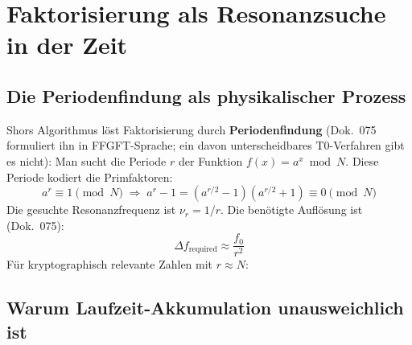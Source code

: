 \section{Faktorisierung als Resonanzsuche in der Zeit}

\subsection{Die Periodenfindung als physikalischer Prozess}

Shors Algorithmus löst Faktorisierung durch \textbf{Periodenfindung}
(Dok.~075 formuliert ihn in FFGFT-Sprache; ein davon unterscheidbares
T0-Verfahren gibt es nicht): Man sucht die Periode $r$ der Funktion
$f(x) = a^x \bmod N$. Diese Periode kodiert die Primfaktoren:
\begin{equation}
    a^r \equiv 1 \pmod{N}
    \;\Rightarrow\;
    a^r - 1 = (a^{r/2} - 1)(a^{r/2} + 1) \equiv 0 \pmod{N}
\end{equation}
Die gesuchte Resonanzfrequenz ist $\nu_r = 1/r$. Die benötigte Auflösung ist
(Dok.~075):
\begin{equation}
    \Delta f_\text{required} \approx \frac{f_0}{r^2}
\end{equation}
Für kryptographisch relevante Zahlen mit $r \approx N$:

\begin{table}[ht]
\centering
{}
\caption{Präzisionsbarriere für Faktorisierung (nach Dok.~075)}
\end{table}

\subsection{Warum Laufzeit-Akkumulation unausweichlich ist}

